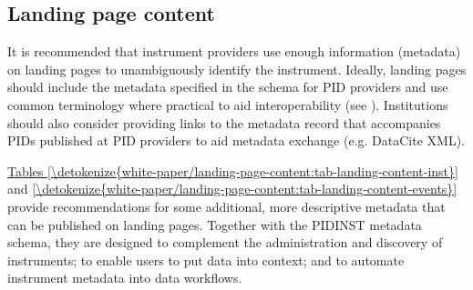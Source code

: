 \documentclass[a4paper,10pt,english]{sphinxmanual}
\begin{document}
\subsection{Landing page content}
\label{\detokenize{white-paper/landing-page-content:landing-page-content}}\label{\detokenize{white-paper/landing-page-content:id1}}\label{\detokenize{white-paper/landing-page-content::doc}}
\sphinxAtStartPar
It is recommended that instrument providers use enough information
(metadata) on landing pages to unambiguously identify the instrument.
Ideally, landing pages should include the metadata specified in the
schema for PID providers and use common terminology where practical to
aid interoperability (see {\hyperref[\detokenize{white-paper/metadata-schema-recommendations:pidinst-metadata-schema-terminologies}]{}}).
Institutions should also consider providing links to the metadata record
that accompanies PIDs published at PID providers to aid metadata
exchange (e.g. DataCite XML).

\sphinxAtStartPar
\hyperref[\detokenize{white-paper/landing-page-content:tab-landing-content-inst}]{Tables \ref{\detokenize{white-paper/landing-page-content:tab-landing-content-inst}}} and
\hyperref[\detokenize{white-paper/landing-page-content:tab-landing-content-events}]{\ref{\detokenize{white-paper/landing-page-content:tab-landing-content-events}}} provide recommendations for
some additional, more descriptive metadata that can be published on
landing pages. Together with the PIDINST metadata schema, they are
designed to complement the administration and discovery of
instruments; to enable users to put data into context; and to automate
instrument metadata into data workflows.
\end{document}
